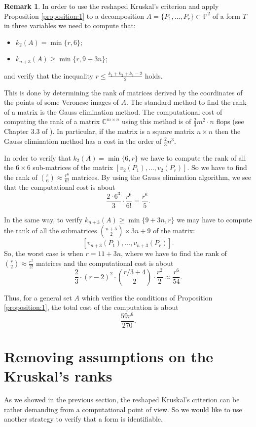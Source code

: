 \documentclass[a4paper,10pt,oneside]{article}
\theoremstyle{casep}
\newcommand{\C}{\mathbb{C}}
\newcommand{\Pj}{\mathbb{P}}
\theoremstyle{definition}
\newtheorem{remark}[theorem]{Remark}
\begin{document}
\begin{remark} 
	\label{costcomp}
In order to use the reshaped Kruskal's criterion and apply Proposition \ref{proposition:1} to a decomposition $A=\{ P_1,\dots, P_r \} \subset \Pj^2$ of a form $T$ in three variables we need to compute that:
\begin{itemize}
\item $k_2(A)= \min\{ r, 6 \}$;
\item $k_{n+3}(A) \geq \min \{ r,9+3n \} $; 
\end{itemize}
and verify that the inequality $r \leq \frac{k_1+k_2+k_3-2}{2}$ holds.

This is done by determining the rank of matrices derived by the coordinates of the points of some Veronese images of $A$.
The standard method to find the rank of a matrix is the Gauss elimination method. 
The computational cost of computing the rank of a matrix $\C^{m \times n}$ using this method is of $\frac{2}{3} m^2 \cdot n$ flops (see Chapter 3.3 of \cite{sei}). 
In particular, if the matrix is a square matrix $ n \times n $ then the Gauss elimination method has a cost in the order of $ \frac{2}{3} n^3$.

In order to verify that $k_2(A)= \min \{ 6,r \}$ we have to compute the rank of all the $6 \times 6$ sub-matrices of the matrix $[v_2(P_1), \dots , v_2(P_r) ]$.
So we have to find the rank of $\binom{r}{6} \approx \frac{r^6}{6!}$ matrices. By using the Gauss elimination algorithm,
 we see that the computational cost is about
$$\frac{2\cdot 6^3}{3} \cdot \frac{r^6}{6!} = \frac{r^6}{5}.$$ 

In the same way, to verify $k_{n+3}(A) \geq \min \{ 9+3n,r \}$ we may have to compute the rank of all the submatrices $\binom{n+5}{2} \times 3n+9$ 
of the matrix: $$[v_{n+3}(P_1), \dots , v_{n+3}(P_r) ].$$ So, the worst case is when $r=11+3n $, where we have to find the rank of 
$\binom{r}{2} \approx \frac{r^2}{2!}$ matrices and the computational cost is about 
$$\frac{2}{3} \cdot (r-2)^2 \cdot \binom{r/3 + 4}{2} \cdot \frac{r^2}{2} \approx \frac{r^6}{54}.$$

Thus, for a general set $A$ which verifies the conditions of Proposition \ref{proposition:1}, the total cost of the computation is about 
$$ \frac{59 r^6}{270}.$$ 
\end{remark}


\section{Removing assumptions on the Kruskal's ranks}
\label{Removing assumptions on the Kruskal's ranks}
As we showed in the previous section, the reshaped Kruskal's criterion can be rather demanding from a computational point of view. So we would like to use another strategy to verify that a form is identifiable.
 \smallskip
 
\end{document}
